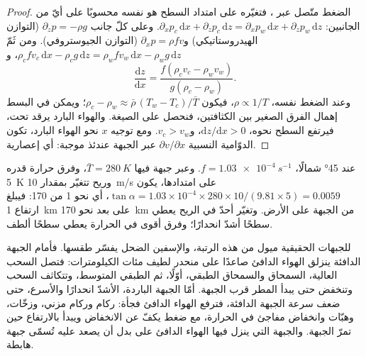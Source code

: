 \begin{proof}
الضغط متّصل عبر ، فتغيّره على امتداد السطح هو
نفسه محسوبًا على أيّ من الجانبين: $\partial_x p_c\,\mathrm{d}x + \partial_z p_c\,\mathrm{d}z =
\partial_x p_w\,\mathrm{d}x + \partial_z p_w\,\mathrm{d}z$. وعلى كلّ جانب $\partial_z p = -\rho g$
(التوازن الهيدروستاتيكي) و$\partial_x p = \rho f v$ (التوازن الجيوستروفي). ومن ثَمّ
$\rho_c f v_c\,\mathrm{d}x - \rho_c g\,\mathrm{d}z = \rho_w f v_w\,\mathrm{d}x - \rho_w
g\,\mathrm{d}z$، و
\[
  \frac{\mathrm{d}z}{\mathrm{d}x} = \frac{f(\rho_c v_c - \rho_w v_w)}{g(\rho_c - \rho_w)} .
\]
وعند الضغط نفسه، $\rho \propto 1/T$، فيكون $\rho_c - \rho_w \approx \bar\rho\,(T_w -
T_c)/\bar T$؛ ويمكن في البسط إهمال الفرق الصغير بين الكثافتين، فنحصل
على الصيغة. والهواء البارد يرقد تحت، فيرتفع السطح نحوه، $\mathrm{d}z/
\mathrm{d}x > 0$، و$v_c > v_w$. ومع توجيه $x$ نحو الهواء البارد، تكون الدوّامية النسبية
$\partial v/\partial x$ عبر الجبهة عندئذ موجبة: أي إعصارية.
\end{proof}

\begin{example}\label{ex:b2:weather-systems:slope}
عند \ang{45} شمالًا، $f = \qty{1.03e-4}{s^{-1}}$. وعبر جبهة فيها $\bar T = \qty{280}{K}$، وفرق
حرارة قدره \qty{5}{K} وريح تتغيّر بمقدار \qty{10}{m/s} على امتدادها، يكون $\tan\alpha
= 1.03 \times 10^{-4} \times 280 \times 10/(9.81 \times 5) = 0.0059$، أي نحو 1 من 170: فيبلغ
 ارتفاع \qty{1}{km} على بعد نحو \qty{170}{km} من الجبهة على الأرض.
وتغيّر أحدّ في الريح يعطي سطحًا أشدّ انحدارًا؛ وفرق أقوى في الحرارة يعطي سطحًا ألطف.
\end{example}

للجبهات الحقيقية ميول من هذه الرتبة، والإسفين الضحل يفسّر طقسها. فأمام
الجبهة الدافئة ينزلق الهواء الدافئ صاعدًا على منحدر لطيف مئات الكيلومترات: فتصل السحب العالية،
السمحاق والسمحاق الطبقي، أوّلًا، ثم الطبقي المتوسط، وتتكاثف السحب وتنخفض حتى
يبدأ المطر قرب الجبهة. أمّا الجبهة الباردة، الأشدّ انحدارًا والأسرع، حتى ضعف سرعة الجبهة
الدافئة، فترفع الهواء الدافئ فجأة: ركام وركام مزني، وزخّات، وهبّات وانخفاض مفاجئ
في الحرارة، مع ضغط يكفّ عن الانخفاض ويبدأ بالارتفاع حين تمرّ الجبهة. والجبهة
التي ينزل فيها الهواء الدافئ على  بدل أن يصعد عليه تُسمّى جبهة هابطة.

